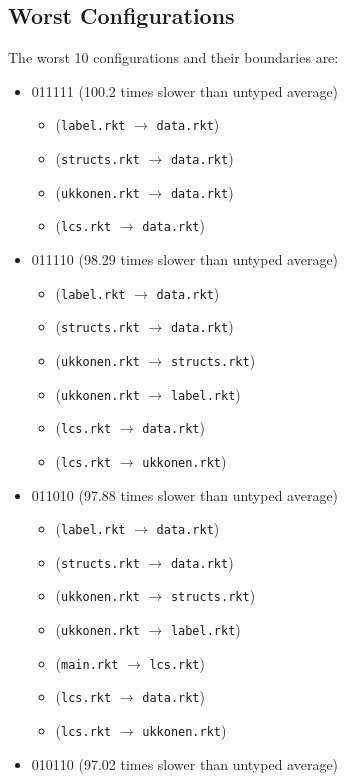 \documentclass{article}
\newcommand{\mono}[1]{\texttt{#1}}
\begin{document}
\subsection{Worst Configurations}
The worst 10 configurations and their boundaries are:
\begin{itemize}
\item 011111 (100.2 times slower than untyped average)
  \begin{itemize}
  \item (\mono{label.rkt} $\rightarrow$ \mono{data.rkt})
  \item (\mono{structs.rkt} $\rightarrow$ \mono{data.rkt})
  \item (\mono{ukkonen.rkt} $\rightarrow$ \mono{data.rkt})
  \item (\mono{lcs.rkt} $\rightarrow$ \mono{data.rkt})
  \end{itemize}
\item 011110 (98.29 times slower than untyped average)
  \begin{itemize}
  \item (\mono{label.rkt} $\rightarrow$ \mono{data.rkt})
  \item (\mono{structs.rkt} $\rightarrow$ \mono{data.rkt})
  \item (\mono{ukkonen.rkt} $\rightarrow$ \mono{structs.rkt})
  \item (\mono{ukkonen.rkt} $\rightarrow$ \mono{label.rkt})
  \item (\mono{lcs.rkt} $\rightarrow$ \mono{data.rkt})
  \item (\mono{lcs.rkt} $\rightarrow$ \mono{ukkonen.rkt})
  \end{itemize}
\item 011010 (97.88 times slower than untyped average)
  \begin{itemize}
  \item (\mono{label.rkt} $\rightarrow$ \mono{data.rkt})
  \item (\mono{structs.rkt} $\rightarrow$ \mono{data.rkt})
  \item (\mono{ukkonen.rkt} $\rightarrow$ \mono{structs.rkt})
  \item (\mono{ukkonen.rkt} $\rightarrow$ \mono{label.rkt})
  \item (\mono{main.rkt} $\rightarrow$ \mono{lcs.rkt})
  \item (\mono{lcs.rkt} $\rightarrow$ \mono{data.rkt})
  \item (\mono{lcs.rkt} $\rightarrow$ \mono{ukkonen.rkt})
  \end{itemize}
\item 010110 (97.02 times slower than untyped average)

\end{itemize}
\end{document}
